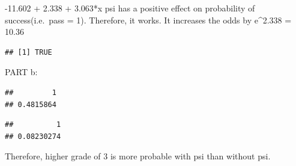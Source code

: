 \documentclass[
]{article}
\newenvironment{Shaded}{\begin{snugshade}}{\end{snugshade}}
\newcommand{\AttributeTok}[1]{\textcolor[rgb]{0.77,0.63,0.00}{#1}}
\newcommand{\DecValTok}[1]{\textcolor[rgb]{0.00,0.00,0.81}{#1}}
\newcommand{\FunctionTok}[1]{\textcolor[rgb]{0.00,0.00,0.00}{#1}}
\newcommand{\NormalTok}[1]{#1}
\newcommand{\OtherTok}[1]{\textcolor[rgb]{0.56,0.35,0.01}{#1}}
\newcommand{\SpecialCharTok}[1]{\textcolor[rgb]{0.00,0.00,0.00}{#1}}
\newcommand{\StringTok}[1]{\textcolor[rgb]{0.31,0.60,0.02}{#1}}
\begin{document}
-11.602 + 2.338 + 3.063*x psi has a positive effect on probability of
success(i.e.~pass = 1). Therefore, it works. It increases the odds by
e\^{}2.338 = 10.36

\begin{Shaded}
\end{Shaded}

\begin{verbatim}
## [1] TRUE
\end{verbatim}

PART b:

\begin{Shaded}
\end{Shaded}

\begin{verbatim}
##         1 
## 0.4815864
\end{verbatim}

\begin{Shaded}
\end{Shaded}

\begin{verbatim}
##          1 
## 0.08230274
\end{verbatim}

Therefore, higher grade of 3 is more probable with psi than without psi.
\end{document}
